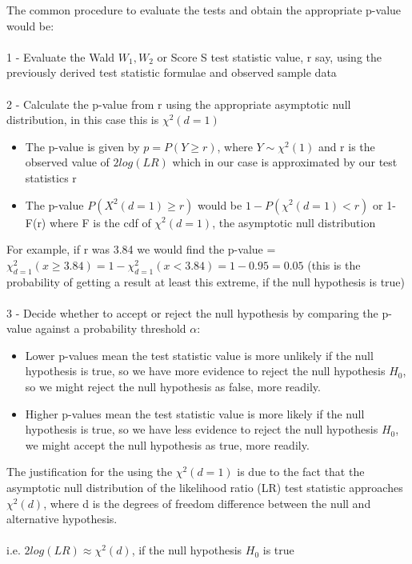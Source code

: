 \documentclass[11pt]{article}   	%
\begin{document}
The common procedure to evaluate the tests and obtain the appropriate p-value would be: \\
\\
1 - Evaluate the Wald $ W_1, W_2 $ or Score S test statistic value, r say, using the previously derived test statistic formulae and observed sample data \\
\\
2 - Calculate the p-value from r using the appropriate asymptotic null distribution, in this case this is $ \chi^2(d=1) $
\begin{itemize}
  \item The p-value is given by $ p = P(Y \geq r) $, where $ Y \sim \chi^2(1) $ and r is the observed value of $ 2 log(LR) $ which in our case is approximated by our test statistics r
  \item The p-value $ P(X^2(d=1) \geq r) $ would be $ 1 - P(\chi^2(d=1) < r) $ or 1-F(r) where F is the cdf of $\chi^2(d=1) $, the asymptotic null distribution
\end{itemize}
For example, if r was 3.84 we would find the p-value = $ \chi^2_{d=1}(x \geq 3.84) = 1 - \chi^2_{d=1}(x < 3.84) = 1 - 0.95 = 0.05 $ (this is the probability of getting a result at least this extreme, if the null hypothesis is true) \\
\\
3 - Decide whether to accept or reject the null hypothesis by comparing the p-value against a probability threshold $ \alpha $:
\begin{itemize}
  \item Lower p-values mean the test statistic value is more unlikely if the null hypothesis is true, so we have more evidence to reject the null hypothesis $ H_0 $, so we might reject the null hypothesis as false, more readily.
  \item Higher p-values mean the test statistic value is more likely if the null hypothesis is true, so we have less evidence to reject the null hypothesis  $H_0$, we might accept the null hypothesis as true, more readily.
\end{itemize}
\vspace{5mm}
The justification for the using the $ \chi^2(d = 1) $ is due to the fact that the asymptotic null distribution of the likelihood ratio (LR) test statistic approaches $ \chi^2(d) $, where d is the degrees of freedom difference between the null and alternative hypothesis. \\
\\
i.e. $ 2 log(LR) \approx \chi^2(d) $, if the null hypothesis $ H_0 $ is true \\
\end{document}

